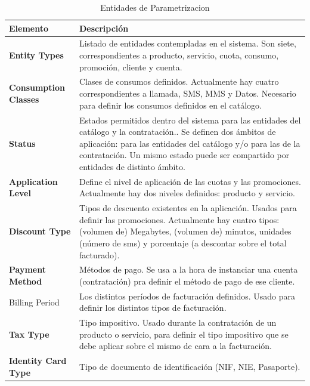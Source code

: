 \begin{table}[H]
  \centering
  \setlength{\leftmargini}{0.4cm}
  \resizebox{14cm}{!} {
  \begin{tabular}{|m{4cm} m{11cm}|}
  \rowcolor{udcpink!25}
  \hline
  	\textbf{Elemento} & \textbf{Descripción} \\\hline
	\textbf{Entity Types} & Listado de entidades contempladas en el sistema. Son siete, correspondientes a producto, servicio, cuota, consumo, promoción, cliente y cuenta.   \\
	\textbf{Consumption Classes} & Clases de consumos definidos. Actualmente hay cuatro correspondientes a llamada, SMS, MMS y Datos. Necesario para definir los consumos definidos en el catálogo. \\
	\textbf{Status} & Estados permitidos dentro del sistema para las entidades del catálogo y la contratación.. Se definen dos ámbitos de aplicación: para las entidades del catálogo y/o para las de la contratación. Un mismo estado puede ser compartido por entidades de distinto ámbito. \\
	\textbf{Application Level} & Define el nivel de aplicación de las cuotas y las promociones. Actualmente hay dos niveles definidos: producto y servicio.  \\
	\textbf{Discount Type} & Tipos de descuento existentes en la aplicación. Usados para definir las promociones. Actualmente hay cuatro tipos: (volumen de) Megabytes, (volumen de) minutos, unidades (número de sms) y porcentaje (a descontar sobre el total facturado).   \\
	\textbf{Payment Method} & Métodos de pago. Se usa a la hora de instanciar una cuenta (contratación) pra definir el método de pago de ese cliente. \\
Billing Period & Los distintos períodos de facturación definidos. Usado para definir los distintos tipos de facturación. \\
	\textbf{Tax Type} & Tipo impositivo. Usado durante la contratación de un producto o servicio, para definir el tipo impositivo que se debe aplicar sobre el mismo de cara a la facturación.\\
	\textbf{Identity Card Type} & Tipo de documento de identificación (NIF, NIE, Pasaporte).
	\\\hline
  \end{tabular}
  } %
  \caption{Entidades de Parametrizacion}
  \label{tab:parametrizacion}
\end{table}

